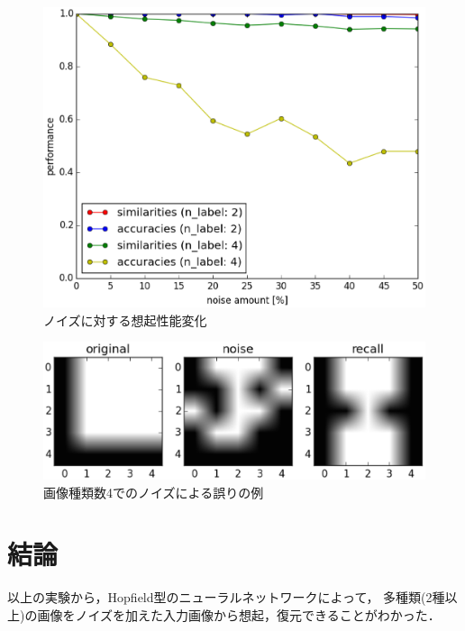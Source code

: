 \documentclass[10pt,twocolumn]{jarticle}
\begin{document}
\begin{figure}[hbtp]
  \centering
    \includegraphics[width=\columnwidth]{figs/noise_performance}
    \caption{ノイズに対する想起性能変化}
    \label{fig:noise-performance}
\end{figure}

\begin{figure}[hbtp]
  \centering
    \includegraphics[width=\columnwidth]{figs/noise_label4_wrong_sample}
    \caption{画像種類数4でのノイズによる誤りの例}
    \label{fig:noise-label4-wrong-sample}
\end{figure}

\section{結論}
以上の実験から，Hopfield型のニューラルネットワークによって，
多種類(2種以上)の画像をノイズを加えた入力画像から想起，復元できることがわかった．


\end{document}
